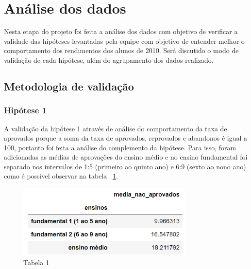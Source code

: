 \documentclass[review]{elsarticle}
\begin{document}
\section{Análise dos dados}
Nesta etapa do projeto foi feita a análise dos dados com objetivo de verificar a validade das hipóteses levantadas pela equipe com objetivo de entender melhor o comportamento dos rendimentos dos alunos de 2010. Será discutido o modo de validação de cada hipótese, além do agrupamento dos dados realizado.\par

\subsection{Metodologia de validação}

\subsubsection{Hipótese 1}
A validação da hipótese 1 através de análise do comportamento da taxa de aprovados porque a soma da taxa de aprovados, reprovados e abandonos é igual a 100, portanto foi feita a análise do complemento da hipótese. Para isso, foram adicionadas as médias de aprovações do ensino médio e no ensino fundamental foi separado nos intervalos de 1:5 (primeiro ao quinto ano) e 6:9 (sexto ao nono ano) como é possível observar na tabela ~\ref{fig:t1}.\par
\begin{figure}[h!]
\includegraphics[width=250pt]{h1_table.png}
\caption{Tabela 1}
\label{fig:t1}
\centering
\end{figure}
\end{document}

